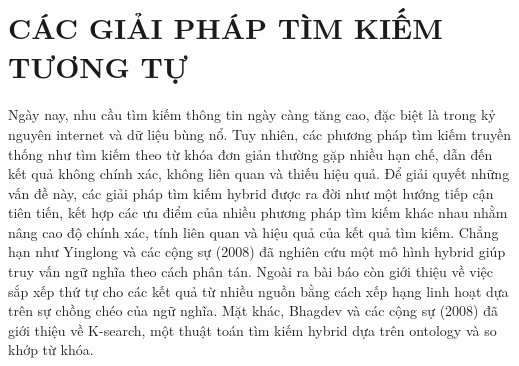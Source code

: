 \section{CÁC GIẢI PHÁP TÌM KIẾM TƯƠNG TỰ}
\hspace*{1cm}Ngày nay, nhu cầu tìm kiếm thông tin ngày càng tăng cao, đặc biệt là trong kỷ nguyên internet và dữ liệu bùng nổ. Tuy nhiên, các phương pháp tìm kiếm truyền thống như tìm kiếm theo từ khóa đơn giản thường gặp nhiều hạn chế, dẫn đến kết quả không chính xác, không liên quan và thiếu hiệu quả. Để giải quyết những vấn đề này, các giải pháp tìm kiếm hybrid được ra đời như một hướng tiếp cận tiên tiến, kết hợp các ưu điểm của nhiều phương pháp tìm kiếm khác nhau nhằm nâng cao độ chính xác, tính liên quan và hiệu quả của kết quả tìm kiếm. 
\hspace*{1cm} Chẳng hạn như Yinglong và các cộng sự (2008) \cite{4709221} đã nghiên cứu một mô hình hybrid giúp truy vấn ngữ nghĩa theo cách phân tán. Ngoài ra bài báo còn giới thiệu về việc sắp xếp thứ tự cho các kết quả từ nhiều nguồn bằng cách xếp hạng linh hoạt dựa trên sự chồng chéo của ngữ nghĩa. Mặt khác, Bhagdev và các cộng sự (2008) \cite{inproceedings} đã giới thiệu về K-search, một thuật toán tìm kiếm hybrid dựa trên ontology và so khớp từ khóa.